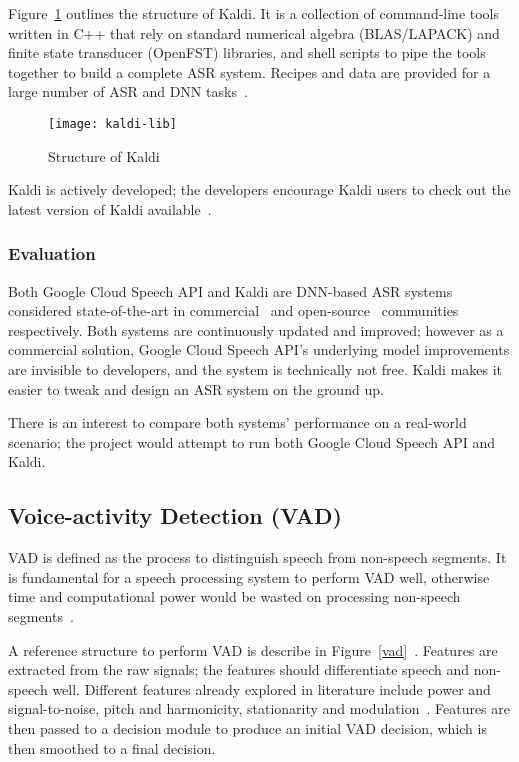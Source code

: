 Figure~\ref{kaldi} outlines the structure of Kaldi. It is a collection of
command-line tools written in C++ that rely on standard numerical
algebra (BLAS/LAPACK) and finite state transducer (OpenFST) libraries,
and shell scripts to pipe the tools together to build a complete ASR
system. Recipes and data are provided for a large number of ASR and DNN
tasks~\cite{kaldi}.

\begin{figure}[h]
\begin{center}
    \texttt{[image: kaldi-lib]}
    \caption{Structure of Kaldi}\label{kaldi}
\end{center}
\end{figure}

Kaldi is actively developed; the developers encourage Kaldi users to
check out the latest version of Kaldi available~\cite{kaldi-ver}.

\subsubsection{Evaluation}

Both Google Cloud Speech API and Kaldi are DNN-based ASR systems considered
state-of-the-art in commercial~\cite{gcs-comp} and open-source~\cite{kaldi-comp}
communities respectively. Both systems are continuously updated and improved;
however as a commercial solution, Google Cloud Speech API's underlying model
improvements are invisible to developers, and the system is technically not
free. Kaldi makes it easier to tweak and design an ASR system on the ground up.

There is an interest to compare both systems' performance on a real-world
scenario; the project would attempt to run both Google Cloud Speech API
and Kaldi.

\subsection{Voice-activity Detection (VAD)}

VAD is defined as the process to distinguish speech from non-speech segments.
It is fundamental for a speech processing system to perform VAD well, otherwise
time and computational power would be wasted on processing non-speech
segments~\cite{vad}.

A reference structure to perform VAD is describe in Figure~\ref{vad}~\cite{vad}.
Features are extracted from the raw signals; the features should differentiate
speech and non-speech well. Different features already explored in literature
include power and signal-to-noise, pitch and harmonicity, stationarity and
modulation~\cite{vad-feats}. Features are then passed to a decision module to
produce an initial VAD decision, which is then smoothed to a final decision.

